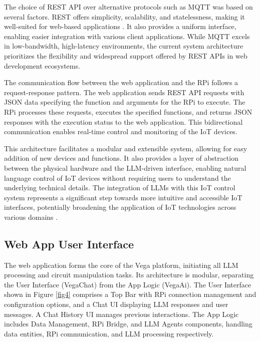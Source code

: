 \documentclass{ieeeaccess}
\begin{document}
The choice of REST API over alternative protocols such as MQTT was based on several factors. REST offers simplicity, scalability, and statelessness, making it well-suited for web-based applications \cite{s21206904}. It also provides a uniform interface, enabling easier integration with various client applications. While MQTT excels in low-bandwidth, high-latency environments, the current system architecture prioritizes the flexibility and widespread support offered by REST APIs in web development ecosystems.


The communication flow between the web application and the RPi follows a request-response pattern. The web application sends REST API requests with JSON data specifying the function and arguments for the RPi to execute. The RPi processes these requests, executes the specified functions, and returns JSON responses with the execution status to the web application. This bidirectional communication enables real-time control and monitoring of the IoT devices.

This architecture facilitates a modular and extensible system, allowing for easy addition of new devices and functions. It also provides a layer of abstraction between the physical hardware and the LLM-driven interface, enabling natural language control of IoT devices without requiring users to understand the underlying technical details. The integration of LLMs with this IoT control system represents a significant step towards more intuitive and accessible IoT interfaces, potentially broadening the application of IoT technologies across various domains \cite{taylor2010software}.

\subsection{Web App User Interface}

The web application forms the core of the Vega platform, initiating all LLM processing and circuit manipulation tasks. Its architecture is modular, separating the User Interface (VegaChat) from the App Logic (VegaAi). The User Interface shown in Figure \ref{fig4} comprises a Top Bar with RPi connection management and configuration options, and a Chat UI displaying LLM responses and user messages. A Chat History UI manages previous interactions. The App Logic includes Data Management, RPi Bridge, and LLM Agents components, handling data entities, RPi communication, and LLM processing respectively.
\end{document}
